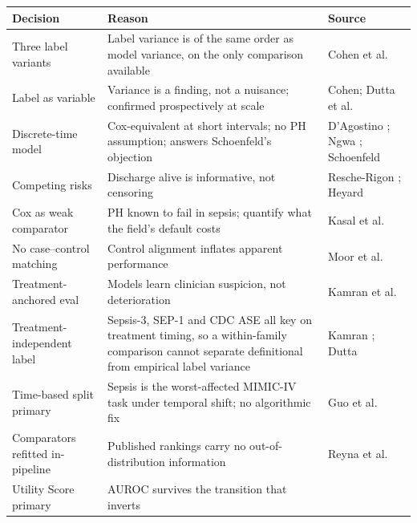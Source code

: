 \begin{table}[H]
    \centering\small
    \begin{tabular}{p{3.1cm}p{5.6cm}p{4cm}}
        \toprule
        \textbf{Decision} & \textbf{Reason} & \textbf{Source} \\
        \midrule
        Three label variants & Label variance is of the same order as model
        variance, on the only comparison available &
        Cohen et al.\ \cite{cohen2024subtle} \\
        Label as variable & Variance is a finding, not a nuisance; confirmed
        prospectively at scale &
        Cohen; Dutta et al.\ \cite{dutta2026performance} \\
        Discrete-time model & Cox-equivalent at short intervals; no PH
        assumption; answers Schoenfeld's objection &
        D'Agostino \cite{dagostino1990pooled};
        Ngwa \cite{ngwa2016comparison};
        Schoenfeld \cite{schoenfeld2006survival} \\
        Competing risks & Discharge alive is informative, not censoring &
        Resche-Rigon \cite{rescherigon2006competing};
        Heyard \cite{heyard2019dynamic} \\
        Cox as weak comparator & PH known to fail in sepsis; quantify what the
        field's default costs &
        Kasal et al.\ \cite{kasal2004cox} \\
        No case--control matching & Control alignment inflates apparent
        performance &
        Moor et al.\ \cite{moor2021review} \\
        Treatment-anchored eval & Models learn clinician suspicion, not
        deterioration &
        Kamran et al.\ \cite{kamran2024evaluation} \\
        Treatment-independent label & Sepsis-3, SEP-1 and CDC ASE all key on
        treatment timing, so a within-family comparison cannot separate
        definitional from empirical label variance &
        Kamran \cite{kamran2024evaluation};
        Dutta \cite{dutta2026performance} \\
        Time-based split primary & Sepsis is the worst-affected MIMIC-IV task
        under temporal shift; no algorithmic fix &
        Guo et al.\ \cite{guo2022temporal} \\
        Comparators refitted in-pipeline & Published rankings carry no
        out-of-distribution information &
        Reyna et al.\ \cite{reyna2020utility} \\
        Utility Score primary & AUROC survives the transition that inverts

\end{tabular}
\end{table}
